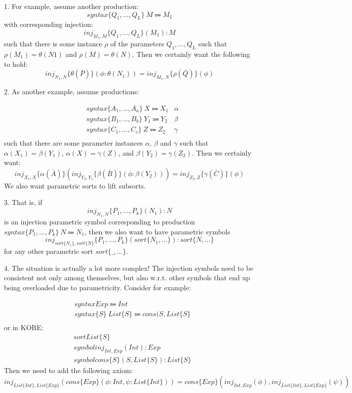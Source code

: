 \documentclass[UTF8,11pt]{article}
\theoremstyle{plain}
\theoremstyle{definition}
\theoremstyle{remark}
\begin{document}
1. For example, assume another production:
\[syntax \{Q_1, \dots,Q_L\} \ M \Coloneqq M_1\]
with corresponding injection:
\[inj_{M_1,M}\{Q_1, \dots,Q_L\}(M_1):M\]
such that there is some instance $\rho$ of the parameters $Q_1, \dots,Q_L$ such that $\rho(M_1) = \theta(N1)$ and $\rho(M) = \theta(N)$. Then we certainly want the following to hold:
\[inj_{N_1,N}\{\theta(\bar{P})\}(\phi:\theta(N_1))=inj_{M_1,N}\{\rho(\bar{Q})\}(\phi)\]

2. As another example, assume productions:

\begin{align*}
&syntax \{A_1, \dots,A_a\} \ X \Coloneqq X_1     & \alpha \\ 
&syntax \{B_1, \dots,B_b\} \ Y_1 \Coloneqq Y_2 & \beta \\
&syntax \{C_1, \dots,C_c\} \ Z \Coloneqq Z_2     & \gamma \\
\end{align*}
such that there are some parameter instances $\alpha$, $\beta$ and $\gamma$ such that $\alpha(X_1)=\beta(Y_1)$, $\alpha(X)=\gamma(Z)$, and $\beta(Y_2)=\gamma(Z_2)$. Then we certainly want:
\[inj_{X_1,X}\{\alpha(\bar{A})\}(inj_{Y_2,Y_1}\{\beta(\bar{B})\}(\phi:\beta(Y_2)))=inj_{Z_2,Z}\{\gamma(\bar{C})\}(\phi)\]
We also want parametric sorts to lift subsorts.

3. That is, if
\[inj_{N_1,N}\{P_1, \dots,P_k\}(N_1):N\]
is an injection parametric symbol corresponding to production $syntax \{P_1, \dots,P_k\} \ N \Coloneqq N_1$, then we also want to have parametric symbols
\[inj_{sort\{N_1\},sort\{N\}}\{P_1, \dots,P_k\}(sort\{N_1,\dots\}):sort\{N,\dots\}\]
for any other parametric sort $sort\{\_,\dots\}$.

4. The situation is actually a lot more complex! The injection symbols need to be consistent not only among themselves, but also w.r.t. other symbols that end up being overloaded due to parametricity. Consider for example:

\begin{align*}
&syntax Exp \Coloneqq Int\\ 
&syntax \{S\} \ List\{S\} \Coloneqq cons(S, List\{S\} \\
\end{align*}
or in KORE:
\begin{align*}
&sort List\{S\} \\ 
&symbol inj_{Int,Exp}(Int):Exp \\
&symbol cons\{S\}(S,List\{S\}):List\{S\}
\end{align*}
Then we need to add the following axiom:
\[inj_{List\{Int\},List\{Exp\}}(cons\{Exp\}(\phi:Int,\psi:List\{Int\}))=cons\{Exp\}(inj_{Int,Exp}(\phi),inj_{List\{Int\},List\{Exp\}}(\psi))\]
\end{document}
